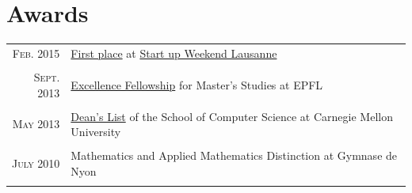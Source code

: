\documentclass[a4paper,11pt]{article} %
\begin{document}
\begin{tabularx}{\textwidth}{r|X}

\end{tabularx}



\section{Awards}

\begin{tabular}{rl}

\textsc{Feb.} 2015 & 
\href{http://tasti.ch}{First place} at
\href{http://lausanne.startupweekend.org/}{Start up Weekend Lausanne}\\
\\
\textsc{Sept.} 2013 & 
\href{http://master.epfl.ch/excellence-fellowships}{Excellence Fellowship} 
for Master's Studies at EPFL\\
\\
\textsc{May} 2013 & 
\href{http://coursecatalog.web.cmu.edu/schoolofcomputerscience/#schoolofcomputersciencescsacademicstandardsandactions}{Dean's
List} of the School of Computer Science at Carnegie Mellon University\\
\\
\textsc{July} 2010 & 
Mathematics and Applied Mathematics Distinction at Gymnase de Nyon\\
\\
\end{tabular}

\end{document}
